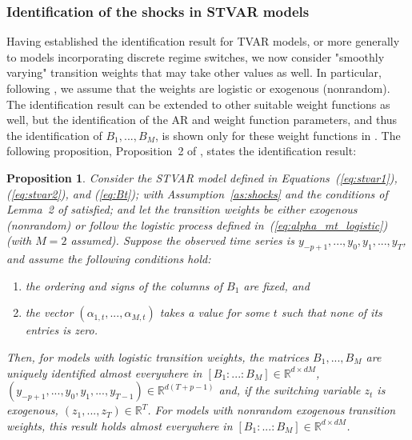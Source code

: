 \documentclass[nojss]{jss}
\newtheorem{proposition}{Proposition}
\begin{document}
\subsubsection{Identification of the shocks in STVAR models}\label{sec:identstvar}

Having established the identification result for TVAR models, or more generally to models incorporating discrete regime switches, we now consider "smoothly varying" transition weights that may take other values as well. In particular, following \cite{Virolainen2:2024}, we assume that the weights are logistic or exogenous (nonrandom). The identification result can be extended to other suitable weight functions as well, but the identification of the AR and weight function parameters, and thus the identification of $B_1,...,B_M$, is shown only for these weight functions in \cite{Virolainen2:2024}. The following proposition, Proposition~2 of \cite{Virolainen2:2024}, states the identification result:

\begin{proposition}\label{prop:stvar_ident}
Consider the STVAR model defined in Equations~(\ref{eq:stvar1}), (\ref{eq:stvar2}), and (\ref{eq:Bt}); with Assumption~\ref{as:shocks} and the conditions of Lemma~2 of \cite{Virolainen2:2024} satisfied; and let the transition weights be either exogenous (nonrandom) or follow the logistic process defined in~(\ref{eq:alpha_mt_logistic}) (with $M=2$ assumed). Suppose the observed time series is $y_{-p+1},...,y_{0},y_{1},...,y_{T}$, and assume the following conditions hold:
\begin{enumerate}%
\item the ordering and signs of the columns of $B_1$ are fixed, and\label{cond:stvar_B_1}
\item the vector $(\alpha_{1,t},...,\alpha_{M,t})$ takes a value for some $t$ such that none of its entries is zero.\label{cond:stvar_alpha}
\end{enumerate}
Then, for models with logistic transition weights, the matrices $B_1,...,B_M$ are uniquely identified almost everywhere in $[B_1:...:B_M] \in\mathbb{R}^{d\times dM}$, $(y_{-p+1},...,y_0,y_1,...,y_{T-1}) \in \mathbb{R}^{d(T+p-1)}$ and, if the switching variable $z_t$ is exogenous, $(z_1,...,z_T)\in \mathbb{R}^{T}$. For models with nonrandom exogenous transition weights, this result holds almost everywhere in $[B_1:...:B_M] \in\mathbb{R}^{d\times dM}$.
\end{proposition}
\end{document}
